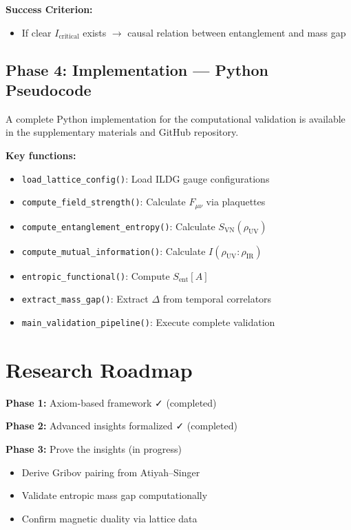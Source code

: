 \documentclass[11pt]{article}
\theoremstyle{definition}
\theoremstyle{remark}
\begin{document}
\textbf{Success Criterion:}
\begin{itemize}
\item If clear $I_{\text{critical}}$ exists $\to$ causal relation between entanglement and mass gap
\end{itemize}

\subsection{Phase 4: Implementation --- Python Pseudocode}

A complete Python implementation for the computational validation is available in the supplementary materials and GitHub repository.

\textbf{Key functions:}
\begin{itemize}
\item \texttt{load\_lattice\_config()}: Load ILDG gauge configurations
\item \texttt{compute\_field\_strength()}: Calculate $F_{\mu\nu}$ via plaquettes
\item \texttt{compute\_entanglement\_entropy()}: Calculate $S_{\text{VN}}(\rho_{\text{UV}})$
\item \texttt{compute\_mutual\_information()}: Calculate $I(\rho_{\text{UV}} : \rho_{\text{IR}})$
\item \texttt{entropic\_functional()}: Compute $S_{\text{ent}}[A]$
\item \texttt{extract\_mass\_gap()}: Extract $\Delta$ from temporal correlators
\item \texttt{main\_validation\_pipeline()}: Execute complete validation
\end{itemize}

\section{Research Roadmap}

\textbf{Phase 1:} Axiom-based framework ✓ (completed)

\textbf{Phase 2:} Advanced insights formalized ✓ (completed)

\textbf{Phase 3:} Prove the insights (in progress)
\begin{itemize}
\item Derive Gribov pairing from Atiyah--Singer
\item Validate entropic mass gap computationally
\item Confirm magnetic duality via lattice data
\end{itemize}
\end{document}
